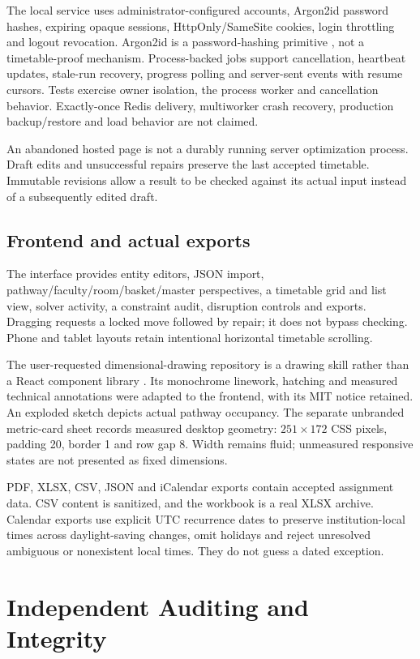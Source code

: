 \documentclass[pdflatex,sn-mathphys-num]{sn-jnl}
\theoremstyle{thmstyleone}
\theoremstyle{thmstyletwo}
\theoremstyle{thmstylethree}
\begin{document}
The local service uses administrator-configured accounts, Argon2id password hashes, expiring opaque sessions, HttpOnly/SameSite cookies, login throttling and logout revocation. Argon2id is a password-hashing primitive \cite{D14}, not a timetable-proof mechanism. Process-backed jobs support cancellation, heartbeat updates, stale-run recovery, progress polling and server-sent events with resume cursors. Tests exercise owner isolation, the process worker and cancellation behavior. Exactly-once Redis delivery, multiworker crash recovery, production backup/restore and load behavior are not claimed.

An abandoned hosted page is not a durably running server optimization process. Draft edits and unsuccessful repairs preserve the last accepted timetable. Immutable revisions allow a result to be checked against its actual input instead of a subsequently edited draft.

\subsection{Frontend and actual exports}

The interface provides entity editors, JSON import, pathway/faculty/room/basket/master perspectives, a timetable grid and list view, solver activity, a constraint audit, disruption controls and exports. Dragging requests a locked move followed by repair; it does not bypass checking. Phone and tablet layouts retain intentional horizontal timetable scrolling.

The user-requested dimensional-drawing repository is a drawing skill rather than a React component library \cite{UIREF}. Its monochrome linework, hatching and measured technical annotations were adapted to the frontend, with its MIT notice retained. An exploded sketch depicts actual pathway occupancy. The separate unbranded metric-card sheet records measured desktop geometry: $251\times172$ CSS pixels, padding 20, border 1 and row gap 8. Width remains fluid; unmeasured responsive states are not presented as fixed dimensions.

PDF, XLSX, CSV, JSON and iCalendar exports contain accepted assignment data. CSV content is sanitized, and the workbook is a real XLSX archive. Calendar exports use explicit UTC recurrence dates to preserve institution-local times across daylight-saving changes, omit holidays and reject unresolved ambiguous or nonexistent local times. They do not guess a dated exception.

\section{Independent Auditing and Integrity}\label{sec:audit}
\end{document}
